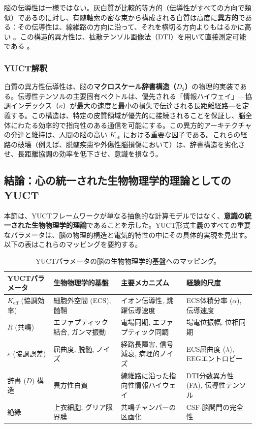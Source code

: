 \documentclass[12pt,a4paper]{article}
\begin{document}
	脳の伝導性は一様ではない。灰白質が比較的等方的（伝導性がすべての方向で類似）であるのに対し、有髄軸索の密な束から構成される白質は高度に\textbf{異方的}である：その伝導性は、線維路の方向に沿って、それを横切る方向よりもはるかに高い \cite{Tuch2001}。この構造的異方性は、拡散テンソル画像法（DTI）を用いて直接測定可能である \cite{Wu2018}。
	
	\subsubsection*{YUCT解釈}
	白質の異方性伝導性は、脳の\textbf{マクロスケール辞書構造（\(D_2\)）}の物理的実装である。伝導性テンソルの主要固有ベクトルは、優先される「情報ハイウェイ」—協調インデックス（\(\kappa\)）が最大の速度と最小の損失で伝達される長距離経路—を定義する。この構造は、特定の皮質領域が優先的に接続されることを保証し、脳全体にわたる効率的で指向性のある通信を可能にする。この異方的アーキテクチャの発達と維持は、人間の脳の高い \(K_{\mathrm{eff}}\) における重要な因子である。これらの経路の破壊（例えば、脱髄疾患や外傷性脳損傷において）は、辞書構造を劣化させ、長距離協調の効率を低下させ、意識を損なう。
	
	\subsection{結論：心の統一された生物物理学的理論としてのYUCT}
	
	本節は、YUCTフレームワークが単なる抽象的な計算モデルではなく、\textbf{意識の統一された生物物理学的理論}であることを示した。YUCT形式主義のすべての重要なパラメータは、脳の物理的構造と電気的特性の中にその具体的実現を見出す。以下の表はこれらのマッピングを要約する。
	
	\begin{table}[H]
		\centering
		\caption{YUCTパラメータの脳の生物物理学的基盤へのマッピング。}
		\label{tab:biophysical-mapping}
		\small
		\begin{tabular}{p{3cm} p{4cm} p{5cm} p{3cm}}
			\toprule
			\textbf{YUCTパラメータ} & \textbf{生物物理学的基盤} & \textbf{主要メカニズム} & \textbf{経験的尺度} \\
			\midrule
			\(K_{\mathrm{eff}}\) (協調効率) & 細胞外空間 (ECS), 髄鞘 & イオン伝導性, 跳躍伝導速度 & ECS体積分率 (\(\alpha\)), 伝導速度 \\
			\(R\) (共鳴) & エファプティック結合, ガンマ振動 & 電場同期, エファプティック同調 & 場電位振幅, 位相同期 \\
			\(\varepsilon\) (協調誤差) & 屈曲度, 脱髄, ノイズ & 経路長障害, 信号減衰, 病理的ノイズ & ECS屈曲度 (\(\lambda\)), EEGエントロピー \\
			辞書 (\(D\)) 構造 & 異方性白質 & 線維路に沿った指向性情報ハイウェイ & DTI分数異方性 (FA), 伝導性テンソル \\
			絶縁 & 上衣細胞, グリア限界膜 & 共鳴チャンバーの区画化 & CSF-脳関門の完全性 \\
			\bottomrule
		\end{tabular}
	\end{table}
	
\end{document}
